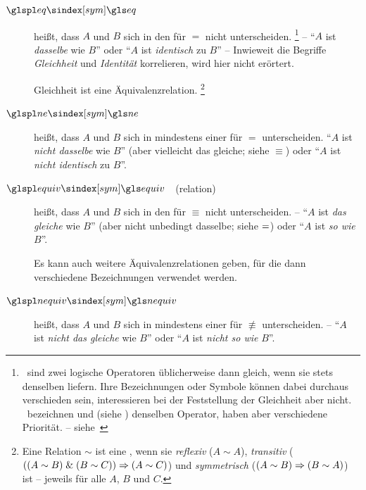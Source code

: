 \begin{description}
	\item[$\glsSym{eq}$~~\emph{}]\label{def:Gleichheit}
	 heißt, dass $A$ und $B$ sich in den  für $=$ nicht unterscheiden.%
	\footnote{%
		\textZB\ sind zwei logische Operatoren üblicherweise dann gleich, wenn sie stets denselben \emph{} liefern.
		Ihre Bezeichnungen oder Symbole können dabei durchaus verschieden sein, interessieren bei der Feststellung der Gleichheit aber nicht.
		\textZB\ bezeichnen \chrqt{$\metaandsym$} und \chrqt{$\srand$} (siehe ) denselben Operator, haben aber verschiedene Priorität. -- siehe~
	}
	-- \enquote{$A$ ist \emph{dasselbe} wie $B$} oder \enquote{$A$ ist \emph{identisch} zu $B$}
	-- Inwieweit die Begriffe \emph{Gleichheit} und \emph{Identität} korrelieren, wird hier nicht erörtert.

	Gleichheit ist eine Äquivalenzrelation.%
	\footnote{%
		Eine Relation $\sim$ ist eine , wenn sie \emph{reflexiv} ($A \sim A$), \emph{transitiv} ($((A \sim B) \;\&\; (B \sim C)) \Rightarrow (A \sim C)$) und \emph{symmetrisch} ($(A \sim B) \Rightarrow (B \sim A)$) ist -- jeweils für alle $A$, $B$ und $C$.
	}
	\item[$\glsSym{ne}$~~\emph{}]\label{def:Ungleichheit}
	 heißt, dass $A$ und $B$ sich in mindestens einer  für $=$ unterscheiden. \enquote{$A$ ist \emph{nicht dasselbe} wie $B$} (aber vielleicht das gleiche; siehe $\equiv$) oder \enquote{$A$ ist \emph{nicht identisch} zu $B$}.
	\item[$\glsSym{equiv}$~~\emph{}(relation)]\label{def:Äquivalenz}
	 heißt, dass $A$ und $B$ sich in den  für $\equiv$ nicht unterscheiden.
	-- \enquote{$A$ ist \emph{das gleiche} wie $B$} (aber nicht unbedingt dasselbe; siehe $=$) oder \enquote{$A$ ist \emph{so wie} $B$}.

	Es kann auch weitere Äquivalenzrelationen geben, für die dann verschiedene Bezeichnungen verwendet werden.
	\item[$\glsSym{nequiv}$~~\emph{}]\label{def:Kontravalenz}
	 heißt, dass $A$ und $B$ sich in mindestens einer  für $\nequiv$ unterscheiden.
	-- \enquote{$A$ ist \emph{nicht das gleiche} wie $B$} oder \enquote{$A$ ist \emph{nicht so wie} $B$}.
\end{description}

